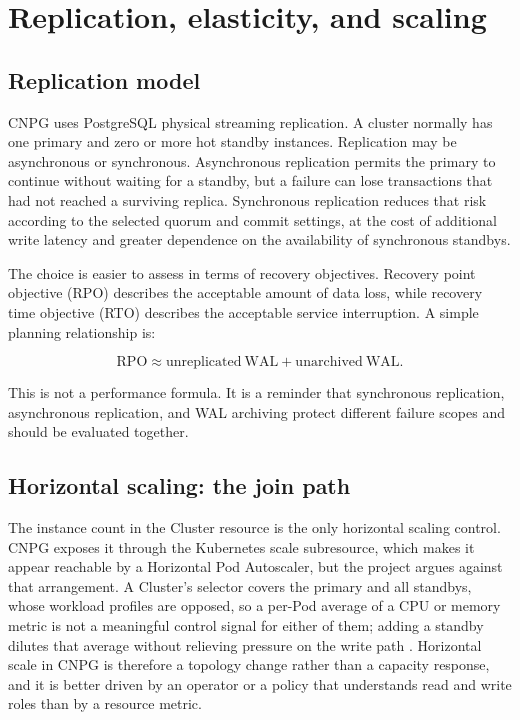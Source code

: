 \documentclass[11pt,a4paper]{article}
\begin{document}
\section{Replication, elasticity, and scaling}

\subsection{Replication model}

CNPG uses PostgreSQL physical streaming replication. A cluster normally has one primary and zero or more hot standby instances. Replication may be asynchronous or synchronous. Asynchronous replication permits the primary to continue without waiting for a standby, but a failure can lose transactions that had not reached a surviving replica. Synchronous replication reduces that risk according to the selected quorum and commit settings, at the cost of additional write latency and greater dependence on the availability of synchronous standbys.

The choice is easier to assess in terms of recovery objectives. Recovery point objective (RPO) describes the acceptable amount of data loss, while recovery time objective (RTO) describes the acceptable service interruption. A simple planning relationship is:

\begin{equation}
  \mathrm{RPO} \approx \mathrm{unreplicated\ WAL} + \mathrm{unarchived\ WAL}.
\end{equation}

This is not a performance formula. It is a reminder that synchronous replication, asynchronous replication, and WAL archiving protect different failure scopes and should be evaluated together.

\subsection{Horizontal scaling: the join path}

The instance count in the Cluster resource is the only horizontal scaling control. CNPG exposes it through the Kubernetes scale subresource, which makes it appear reachable by a Horizontal Pod Autoscaler, but the project argues against that arrangement. A Cluster's selector covers the primary and all standbys, whose workload profiles are opposed, so a per-Pod average of a CPU or memory metric is not a meaningful control signal for either of them; adding a standby dilutes that average without relieving pressure on the write path \cite{cnpg-resource-management}. Horizontal scale in CNPG is therefore a topology change rather than a capacity response, and it is better driven by an operator or a policy that understands read and write roles than by a resource metric.
\end{document}

